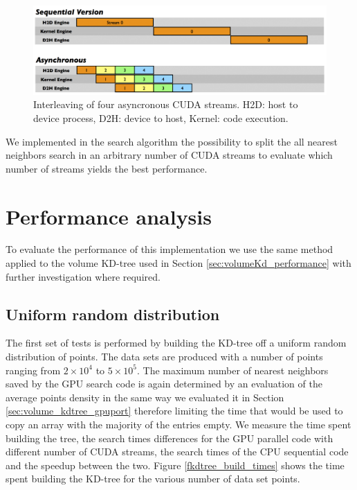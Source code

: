 \begin{figure}
\includegraphics[width=\textwidth]{fkdtree/cuda_streams.png}
\caption{Interleaving of four asyncronous CUDA streams. H2D: host to device process, D2H: device to host, Kernel: code execution.}
\label{cuda_streams}
\end{figure}

We implemented in the search algorithm the possibility to split the all nearest neighbors search in an arbitrary number of CUDA streams to evaluate which number of streams yields the best performance.\\

\section{Performance analysis}
To evaluate the performance of this implementation we use the same method applied to the volume KD-tree used in Section \ref{sec:volumeKd_performance} with further investigation where required.\\

\subsection{Uniform random distribution}
The first set of tests is performed by building the KD-tree off a uniform random distribution of points. The data sets are produced with a number of points ranging from $2 \times 10^4$ to $5 \times 10^5$. The maximum number of nearest neighbors saved by the GPU search code is again determined by an evaluation of the average points density in the same way we evaluated it in Section \ref{sec:volume_kdtree_gpuport} therefore limiting the time that would be used to copy an array with the majority of the entries empty.
We measure the time spent building the tree, the search times differences for the GPU parallel code with different number of CUDA streams, the search times of the CPU sequential code and the speedup between the two.
Figure \ref{fkdtree_build_times} shows the time spent building the KD-tree for the various number of data set points.

